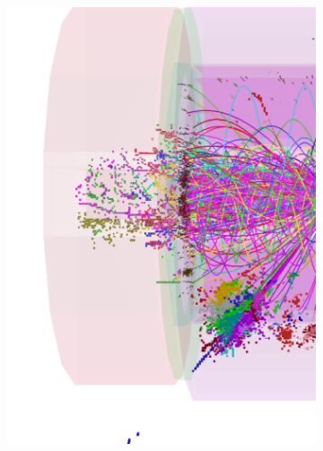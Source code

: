 \begin{figure}[tdbph]
\centering
  \begin{subfigure}[b]{0.45\textwidth}
    \includegraphics[width=\textwidth]{pandora/evtDisplayggHad1}
    \caption{}
    \label{fig:pandoraEvtDisplayggHad1}
  \end{subfigure}
  \begin{subfigure}[b]{0.45\textwidth}

\end{subfigure}
\end{figure}
